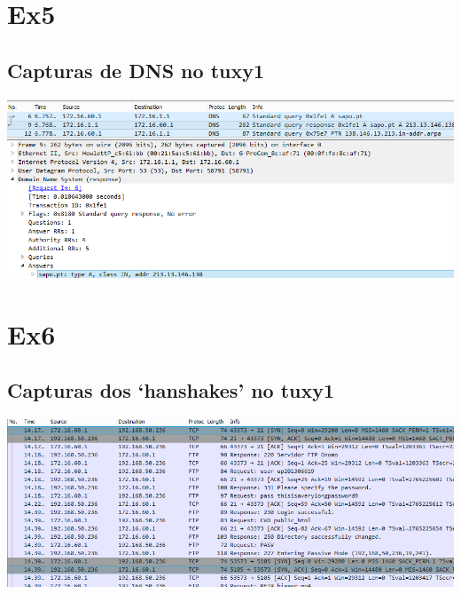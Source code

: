 \documentclass[11pt,a4paper,reqno]{report}
\numberwithin{equation}{section}
\begin{document}
\begin{appendices}

\section{Ex5}%

\subsection{Capturas de DNS no tuxy1}
\label{ex5_dns}
\includegraphics[width=18cm]{ex5_dns.png}

\section{Ex6}%

\subsection{Capturas dos `hanshakes' no tuxy1}
\label{ex6_tux1_handshakes}
\includegraphics[width=18cm]{ex6_tux1_handshakes.png}


\end{appendices}
\end{document}
